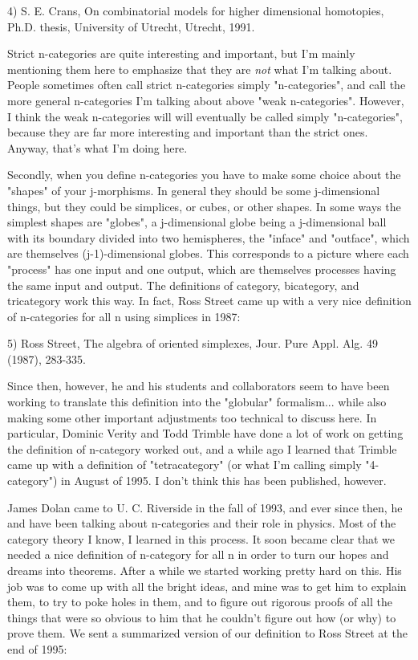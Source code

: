 4) S. E. Crans, On combinatorial models for higher dimensional
homotopies, Ph.D. thesis, University of Utrecht, Utrecht, 1991.

Strict n-categories are quite interesting and important, but I'm
mainly mentioning them here to emphasize that they are \emph{not} what I'm
talking about.  People sometimes often call strict n-categories simply
"n-categories", and call the more general n-categories I'm talking
about above "weak n-categories".  However, I think the weak
n-categories will will eventually be called simply "n-categories",
because they are far more interesting and important than the strict
ones.  Anyway, that's what I'm doing here.

Secondly, when you define n-categories you have to make some choice
about the "shapes" of your j-morphisms.  In general they should be
some j-dimensional things, but they could be simplices, or cubes, or
other shapes.  In some ways the simplest shapes are "globes", a
j-dimensional globe being a j-dimensional ball with its boundary
divided into two hemispheres, the "inface" and "outface", which are
themselves (j-1)-dimensional globes.  This corresponds to a picture
where each "process" has one input and one output, which are themselves
processes having the same input and output.   The definitions of
category, bicategory, and tricategory work this way.  In fact, Ross
Street came up with a very nice definition of n-categories for all n
using simplices in 1987:

5) Ross Street, The algebra of oriented simplexes, Jour. Pure
Appl. Alg. 49 (1987), 283-335.

Since then, however, he and his students and collaborators seem to
have been working to translate this definition into the "globular"
formalism... while also making some other important adjustments too
technical to discuss here.  In particular, Dominic Verity and Todd
Trimble have done a lot of work on getting the definition of
n-category worked out, and a while ago I learned that Trimble came up
with a definition of "tetracategory" (or what I'm calling simply
"4-category") in August of 1995.  I don't think this has been
published, however.

James Dolan came to U. C. Riverside in the fall of 1993, and ever
since then, he and have been talking about n-categories and their role
in physics.  Most of the category theory I know, I learned in this
process.  It soon became clear that we needed a nice definition of
n-category for all n in order to turn our hopes and dreams into
theorems.  After a while we started working pretty hard on this.  His
job was to come up with all the bright ideas, and mine was to get him
to explain them, to try to poke holes in them, and to figure out
rigorous proofs of all the things that were so obvious to him that he
couldn't figure out how (or why) to prove them.  We sent a summarized
version of our definition to Ross Street at the end of 1995:

